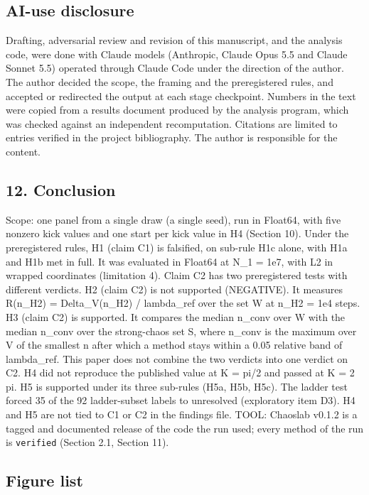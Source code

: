 \documentclass[
  11pt,
]{article}
\begin{document}
\subsection{AI-use disclosure}\label{ai-use-disclosure}

Drafting, adversarial review and revision of this manuscript, and the
analysis code, were done with Claude models (Anthropic, Claude Opus 5.5
and Claude Sonnet 5.5) operated through Claude Code under the direction
of the author. The author decided the scope, the framing and the
preregistered rules, and accepted or redirected the output at each stage
checkpoint. Numbers in the text were copied from a results document
produced by the analysis program, which was checked against an
independent recomputation. Citations are limited to entries verified in
the project bibliography. The author is responsible for the content.

\subsection{12. Conclusion}\label{conclusion}

Scope: one panel from a single draw (a single seed), run in Float64,
with five nonzero kick values and one start per kick value in H4
(Section 10). Under the preregistered rules, H1 (claim C1) is falsified,
on sub-rule H1c alone, with H1a and H1b met in full. It was evaluated in
Float64 at N\_1 = 1e7, with L2 in wrapped coordinates (limitation 4).
Claim C2 has two preregistered tests with different verdicts. H2 (claim
C2) is not supported (NEGATIVE). It measures R(n\_H2) = Delta\_V(n\_H2)
/ lambda\_ref over the set W at n\_H2 = 1e4 steps. H3 (claim C2) is
supported. It compares the median n\_conv over W with the median n\_conv
over the strong-chaos set S, where n\_conv is the maximum over V of the
smallest n after which a method stays within a 0.05 relative band of
lambda\_ref. This paper does not combine the two verdicts into one
verdict on C2. H4 did not reproduce the published value at K = pi/2 and
passed at K = 2 pi. H5 is supported under its three sub-rules (H5a, H5b,
H5c). The ladder test forced 35 of the 92 ladder-subset labels to
unresolved (exploratory item D3). H4 and H5 are not tied to C1 or C2 in
the findings file. TOOL: Chaoslab v0.1.2 is a tagged and documented
release of the code the run used; every method of the run is
\texttt{verified} (Section 2.1, Section 11).

\subsection{Figure list}\label{figure-list}
\end{document}

